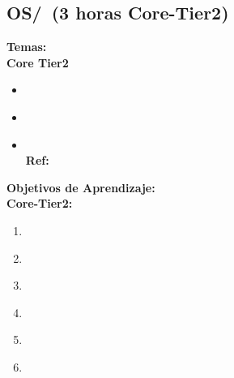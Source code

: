 \subsection{OS/\OSMemoryManagement~(3 horas Core-Tier2)}\label{sec:BOK:OSMemoryManagement}
\noindent \textbf{Temas:}\\
\noindent \textbf{Core Tier2}
\begin{itemize}
	\item \OSMemoryManagementTopicReview\label{sec:BOK:OSMemoryManagementTopicReview}
	\item \OSMemoryManagementTopicWorking\label{sec:BOK:OSMemoryManagementTopicWorking}
	\item \OSMemoryManagementTopicCaching\xspace \\ \textbf{Ref:} \label{sec:BOK:OSMemoryManagementTopicCaching}
\end{itemize}


\noindent \textbf{Objetivos de Aprendizaje:}\\
\noindent \textbf{Core-Tier2:}
\begin{enumerate}
	\setcounter{enumi}{0}
	\item \OSMemoryManagementLOExplainMemory\xspace[\OSMemoryManagementLOExplainMemoryLevel]\label{sec:BOK:OSMemoryManagementLOExplainMemory}
	\item \OSMemoryManagementLOSummarizeTheVirtual\xspace[\OSMemoryManagementLOSummarizeTheVirtualLevel]\label{sec:BOK:OSMemoryManagementLOSummarizeTheVirtual}
	\item \OSMemoryManagementLOEvaluateTheIn\xspace[\OSMemoryManagementLOEvaluateTheInLevel]\label{sec:BOK:OSMemoryManagementLOEvaluateTheIn}
	\item \OSMemoryManagementLODefend\xspace[\OSMemoryManagementLODefendLevel]\label{sec:BOK:OSMemoryManagementLODefend}
	\item \OSMemoryManagementLODescribeTheAndCache\xspace[\OSMemoryManagementLODescribeTheAndCacheLevel]\label{sec:BOK:OSMemoryManagementLODescribeTheAndCache}
	\item \OSMemoryManagementLODiscussTheThrashing\xspace[\OSMemoryManagementLODiscussTheThrashingLevel]\label{sec:BOK:OSMemoryManagementLODiscussTheThrashing}
\end{enumerate}


